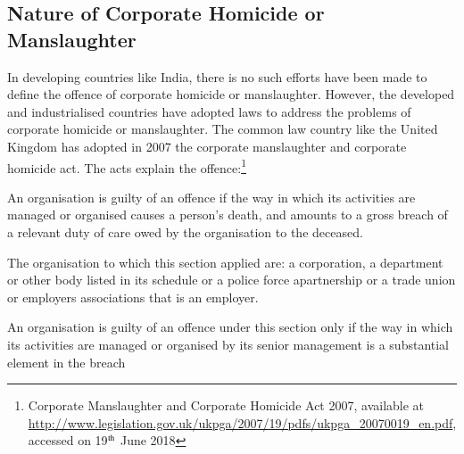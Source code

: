 \begin{multicols}{2}
\vspace{-.3cm}

\subsection{Nature of Corporate Homicide or Manslaughter}\label{subsection-3.1}

\vspace{-.2cm}

\noi
In developing countries like India, there is no such efforts have been made to define
the offence of corporate homicide or manslaughter. However, the developed and
industrialised countries have adopted laws to address the problems of corporate
homicide or manslaughter. The common law country like the United Kingdom has
adopted in 2007 the corporate manslaughter and corporate homicide act. The acts
explain the offence:\footnote{Corporate Manslaughter and Corporate Homicide Act 2007, available at \url{http://www.legislation.gov.uk/ukpga/2007/19/pdfs/ukpga_20070019_en.pdf}, accessed on 19$^{\rm th}$ June 2018}

\vspace{-.4cm}

\noi
\begin{quoting}
An organisation is guilty of an offence if the way in which its activities are
managed or organised causes a person's death, and amounts to a gross breach of
a relevant duty of care owed by the organisation to the deceased.
\vspace{-.1cm}
\end{quoting}

\vspace{-.6cm}

\noi
\begin{quoting}
The organisation to which this section applied are: a corporation, a department
or other body listed in its schedule or a police force apartnership or a trade
union or employers associations that is an employer.

\vspace{-.1cm}

\end{quoting}

\vspace{-.7cm}

\noi
\begin{quoting}
An organisation is guilty of an offence under this section only if the way in
which its activities are managed or organised by its senior management is a
substantial element in the breach
\vspace{-.1cm}
\end{quoting}


\end{multicols}
